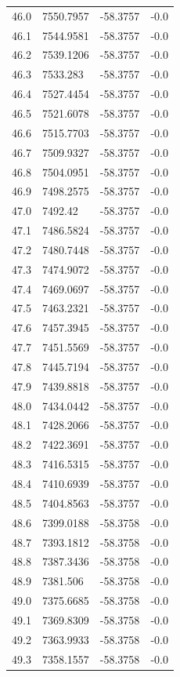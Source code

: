 \begin{table}[H]
\begin{tabular}{llll}
46.0 & 7550.7957 & -58.3757 & -0.0 \\
46.1 & 7544.9581 & -58.3757 & -0.0 \\
46.2 & 7539.1206 & -58.3757 & -0.0 \\
46.3 & 7533.283 & -58.3757 & -0.0 \\
46.4 & 7527.4454 & -58.3757 & -0.0 \\
46.5 & 7521.6078 & -58.3757 & -0.0 \\
46.6 & 7515.7703 & -58.3757 & -0.0 \\
46.7 & 7509.9327 & -58.3757 & -0.0 \\
46.8 & 7504.0951 & -58.3757 & -0.0 \\
46.9 & 7498.2575 & -58.3757 & -0.0 \\
47.0 & 7492.42 & -58.3757 & -0.0 \\
47.1 & 7486.5824 & -58.3757 & -0.0 \\
47.2 & 7480.7448 & -58.3757 & -0.0 \\
47.3 & 7474.9072 & -58.3757 & -0.0 \\
47.4 & 7469.0697 & -58.3757 & -0.0 \\
47.5 & 7463.2321 & -58.3757 & -0.0 \\
47.6 & 7457.3945 & -58.3757 & -0.0 \\
47.7 & 7451.5569 & -58.3757 & -0.0 \\
47.8 & 7445.7194 & -58.3757 & -0.0 \\
47.9 & 7439.8818 & -58.3757 & -0.0 \\
48.0 & 7434.0442 & -58.3757 & -0.0 \\
48.1 & 7428.2066 & -58.3757 & -0.0 \\
48.2 & 7422.3691 & -58.3757 & -0.0 \\
48.3 & 7416.5315 & -58.3757 & -0.0 \\
48.4 & 7410.6939 & -58.3757 & -0.0 \\
48.5 & 7404.8563 & -58.3757 & -0.0 \\
48.6 & 7399.0188 & -58.3758 & -0.0 \\
48.7 & 7393.1812 & -58.3758 & -0.0 \\
48.8 & 7387.3436 & -58.3758 & -0.0 \\
48.9 & 7381.506 & -58.3758 & -0.0 \\
49.0 & 7375.6685 & -58.3758 & -0.0 \\
49.1 & 7369.8309 & -58.3758 & -0.0 \\
49.2 & 7363.9933 & -58.3758 & -0.0 \\
49.3 & 7358.1557 & -58.3758 & -0.0 \\

\end{tabular}
\end{table}
